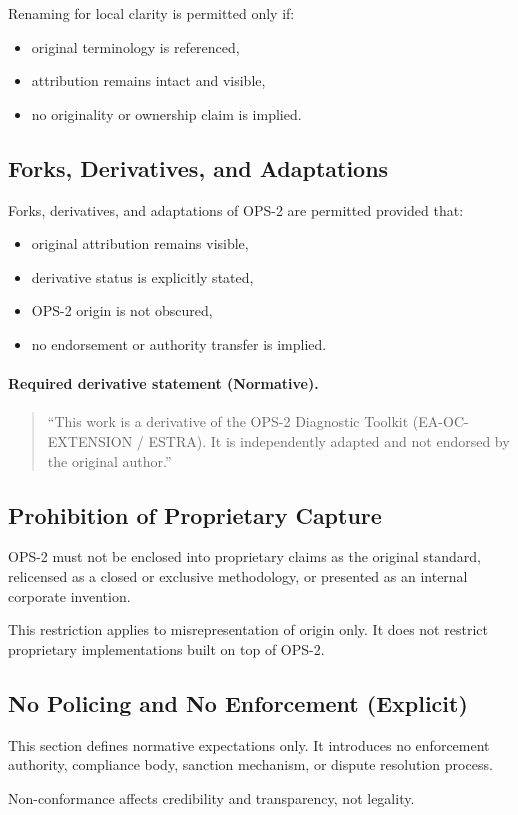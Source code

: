 Renaming for local clarity is permitted only if:
\begin{itemize}
  \item original terminology is referenced,
  \item attribution remains intact and visible,
  \item no originality or ownership claim is implied.
\end{itemize}

\subsection{Forks, Derivatives, and Adaptations}
Forks, derivatives, and adaptations of OPS-2 are permitted provided that:
\begin{itemize}
  \item original attribution remains visible,
  \item derivative status is explicitly stated,
  \item OPS-2 origin is not obscured,
  \item no endorsement or authority transfer is implied.
\end{itemize}

\paragraph{Required derivative statement (Normative).}
\begin{quote}
``This work is a derivative of the OPS-2 Diagnostic Toolkit (EA-OC-EXTENSION / ESTRA).
It is independently adapted and not endorsed by the original author.''
\end{quote}

\subsection{Prohibition of Proprietary Capture}
OPS-2 must not be enclosed into proprietary claims as the original standard, relicensed as a closed or exclusive methodology, or presented as an internal corporate invention.

This restriction applies to misrepresentation of origin only.
It does not restrict proprietary implementations built on top of OPS-2.

\subsection{No Policing and No Enforcement (Explicit)}
This section defines normative expectations only.
It introduces no enforcement authority, compliance body, sanction mechanism, or dispute resolution process.

Non-conformance affects credibility and transparency, not legality.
